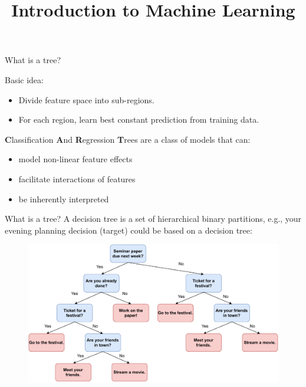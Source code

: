 \documentclass[11pt,compress,t,notes=noshow, xcolor=table]{beamer}
\title{Introduction to Machine Learning}
\institute{\href{https://compstat-lmu.github.io/lecture_i2ml/}{compstat-lmu.github.io/lecture\_i2ml}}
\date{}
\begin{document}
\sloppy

\begin{vbframe}{What is a tree?}

Basic idea: 
\begin{itemize}
\item Divide feature space into sub-regions.%
\item For each region, learn best constant prediction from  training data. %
\end{itemize}

\vspace{0.5cm}

    \textbf{C}lassification \textbf{A}nd \textbf{R}egression \textbf{T}rees are a class of models that can:
  \begin{itemize}
    \item model non-linear feature effects
    \item facilitate interactions of features
    \item be inherently interpreted
  \end{itemize}
\end{vbframe}

\begin{vbframe}{What is a tree?}
A decision tree is a set of hierarchical binary partitions, e.g., your evening planning decision (target) could be based on a decision tree:

  \begin{figure}
    \centering
\includegraphics[width=1\textwidth, keepaspectratio]{figure/nutshell-example.pdf}
    \end{figure}


\end{vbframe}
\end{document}
